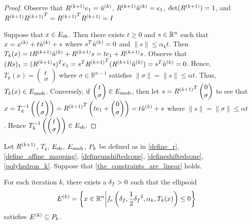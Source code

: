 \begin{proof}
Observe that ${R^{(k+1)}} e_1 = {{{\hat u}^{(k)}}}$, ${R^{(k+1)}} {{{\hat u}^{(k)}}} = e_1$, $\det({R^{(k+1)}}) = 1$, and 
${R^{(k+1)}} {R^{(k+1)}} ^T = {R^{(k+1)}} ^T{R^{(k+1)}} = I$

Suppose that $x \in {E_{\textrm{sh}}}$.
Then there exists $t \ge 0$ and $s \in \mathbb R^n$ such that $x = x^{(k)} + t {{{\hat u}^{(k)}}}+ s$ where $s^T {{{\hat u}^{(k)}}} = 0$ and $\|s\| \le \alpha_k t$.
Then $T_k(x) = t{R^{(k+1)}}{{{\hat u}^{(k)}}} + {R^{(k+1)}} s = te_1 + {R^{(k+1)}} s$.
Observe that $(Rs)_1 = ({R^{(k+1)}} s)^Te_1 = s^T{R^{(k+1)}}^T({R^{(k+1)}} {{{\hat u}^{(k)}}}) = s^T {{{\hat u}^{(k)}}} = 0$.
Hence,
$T_k(x) = \begin{pmatrix}
t \\
\sigma
\end{pmatrix}$ where $\sigma \in \mathbb R ^ {n-1}$ satisfies $\|\sigma\| = \|s\| \le \alpha t$.
Thus, $T_k(x) \in {E_{\textrm{unsh}}}$.
Conversely, if $\begin{pmatrix}
t \\
\sigma
\end{pmatrix} \in {E_{\textrm{unsh}}}$, then let
$s = {R^{(k+1)}}^T\begin{pmatrix}
0 \\
\sigma
\end{pmatrix}$
to see that
$x = T_k^{-1}\left(\begin{pmatrix}
t \\
\sigma
\end{pmatrix} \right)= {R^{(k+1)}}^T\left(t e_1 + \begin{pmatrix}
0 \\
\sigma
\end{pmatrix}\right) = t {{{\hat u}^{(k)}}} + s$ where 
$\|s\| = \|\sigma\| \le \alpha t$.
Hence $T_k^{-1}\left(\begin{pmatrix}
t \\
\sigma
\end{pmatrix}\right) \in {E_{\textrm{sh}}}$.
\end{proof}



\begin{lemma}
\label{ellipsoid_fits}
Let ${R^{(k+1)}}$, $T_k$, ${E_{\textrm{sh}}}$, ${E_{\textrm{unsh}}}$, ${P_k}$ be defined as in
\cref{define_r}, \cref{define_affine_mapping}, \cref{defineunshiftedcone}, \cref{defineshiftedcone}, \cref{polyhedron_k}.
Suppose that \cref{the_constraints_are_linear} holds.

For each iteration $k$, there exists a ${\delta_{f}} > 0$ such that the ellipsoid
\begin{align}
{E^{(k)}} = \left\{x \in \mathbb R^n \bigg | f_e\left({\delta_{f}}, \frac 1 2 {\delta_{f}}^2, \alpha_k, T_k(x)\right) \le 0\right\} \label{definefeasibleellipsoid}
\end{align}
satisfies ${E^{(k)}} \subseteq {P_k}$.
\end{lemma}

